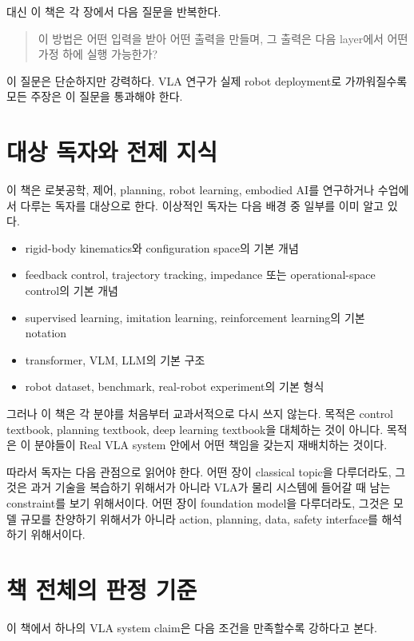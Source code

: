 대신 이 책은 각 장에서 다음 질문을 반복한다.

\begin{quote}
이 방법은 어떤 입력을 받아 어떤 출력을 만들며, 그 출력은 다음 layer에서 어떤 가정 하에 실행 가능한가?
\end{quote}

이 질문은 단순하지만 강력하다. VLA 연구가 실제 robot deployment로 가까워질수록 모든 주장은 이 질문을 통과해야 한다.

\section{대상 독자와 전제 지식}

이 책은 로봇공학, 제어, planning, robot learning, embodied AI를 연구하거나 수업에서 다루는 독자를 대상으로 한다. 이상적인 독자는 다음 배경 중 일부를 이미 알고 있다.

\begin{itemize}
  \item rigid-body kinematics와 configuration space의 기본 개념
  \item feedback control, trajectory tracking, impedance 또는 operational-space control의 기본 개념
  \item supervised learning, imitation learning, reinforcement learning의 기본 notation
  \item transformer, VLM, LLM의 기본 구조
  \item robot dataset, benchmark, real-robot experiment의 기본 형식
\end{itemize}

그러나 이 책은 각 분야를 처음부터 교과서적으로 다시 쓰지 않는다. 목적은 control textbook, planning textbook, deep learning textbook을 대체하는 것이 아니다. 목적은 이 분야들이 Real VLA system 안에서 어떤 책임을 갖는지 재배치하는 것이다.

따라서 독자는 다음 관점으로 읽어야 한다. 어떤 장이 classical topic을 다루더라도, 그것은 과거 기술을 복습하기 위해서가 아니라 VLA가 물리 시스템에 들어갈 때 남는 constraint를 보기 위해서이다. 어떤 장이 foundation model을 다루더라도, 그것은 모델 규모를 찬양하기 위해서가 아니라 action, planning, data, safety interface를 해석하기 위해서이다.

\section{책 전체의 판정 기준}

이 책에서 하나의 VLA system claim은 다음 조건을 만족할수록 강하다고 본다.

